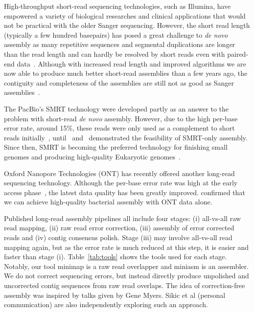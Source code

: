 \documentclass{bioinfo}
\begin{document}
High-throughput short-read sequencing technologies, such as Illumina, have
empowered a variety of biological researches and clinical applications that
would not be practical with the older Sanger sequencing. However, the short
read length (typically a few hundred basepairs) has posed a great challenge to
\emph{de novo} assembly as many repetitive sequences and segmental duplications
are longer than the read length and can hardly be resolved by short reads even
with paired-end data~\citep{Alkan:2011zr}. Although with increased read length
and improved algorithms we are now able to produce much better short-read
assemblies than a few years ago, the contiguity and completeness of the
assemblies are still not as good as Sanger assemblies~\citep{Chaisson:2015wj}.

The PacBio's SMRT technology were developed partly as an answer to the
problem with short-read \emph{de novo} assembly. However, due to the high
per-base error rate, around 15\%, these reads were only used as a complement to
short reads initially~\citep{Bashir:2012gb,Ribeiro:2012bx,Koren:2012pt},
until~\citet{Chin:2013qr} and~\citet{Koren:2013fc} demonstrated the feasibility
of SMRT-only assembly. Since then, SMRT is becoming the preferred technology
for finishing small genomes and producing high-quality Eukaryotic
genomes~\citep{Berlin:2015xy}.

Oxford Nanopore Technologies (ONT) has recently offered another long-read
sequencing technology. Although the per-base error rate was high at the
early access phase~\citep{Quick:2014uf}, the latest data quality has been
greatly improved. \citet{Loman:2015xu} confirmed that we can achieve
high-quality bacterial assembly with ONT data alone.

Published long-read assembly pipelines all include four stages: (i) all-vs-all
raw read mapping, (ii) raw read error correction, (iii) assembly of error
corrected reads and (iv) contig consensus polish. Stage (iii) may involve
all-vs-all read mapping again, but as the error rate is much reduced at this
step, it is easier and faster than stage (i). Table~\ref{tab:tools} shows the tools used for
each stage. Notably, our tool minimap is a raw read overlapper and miniasm is
an assembler. We do not correct sequencing errors, but instead directly produce
unpolished and uncorrected contig sequences from raw read overlaps. The idea of
correction-free assembly was inspired by talks given by Gene Myers.
Sikic et al (personal communication) are also independently exploring such an
approach.
\end{document}

